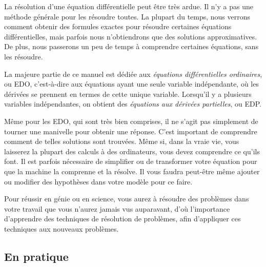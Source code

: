 La résolution d'une équation différentielle peut être très ardue.  
Il n'y a pas une méthode générale pour les résoudre toutes.
La plupart du temps, nous verrons comment obtenir des formules exactes 
pour résoudre certaines équations différentielles,
mais parfois nous n'obtiendrons que des solutions approximatives. 
De plus, nous passerons un peu de temps à comprendre certaines équations, sans les résoudre.

La majeure partie de ce manuel est dédiée aux
\emph{équations différentielles ordinaires},
ou EDO, c'est-à-dire aux équations ayant une seule variable indépendante, 
où les dérivées se prennent en termes de cette unique variable.
Lorsqu'il y a plusieurs variables indépendantes, on obtient des
\emph{équations aux dérivées partielles},
ou EDP.

Même pour les EDO, qui sont très bien comprises, 
il ne s'agit pas simplement de tourner une manivelle pour obtenir une réponse.
C'est important de comprendre comment de telles solutions sont trouvées.
Même si, dans la vraie vie, vous laisserez la plupart des calculs à des ordinateurs, 
vous devez comprendre ce qu'ils font.
Il est parfois nécessaire de simplifier ou de transformer votre équation 
pour que la machine la comprenne et la résolve.
Il vous faudra peut-être même ajouter ou modifier des hypothèses dans votre modèle pour ce faire.

Pour réussir en génie ou en science, vous aurez à résoudre des problèmes 
dans votre travail que vous n'aurez jamais vus auparavant,
d'où l'importance d'apprendre des techniques de résolution de problèmes, 
afin d'appliquer ces techniques aux nouveaux problèmes.

\subsection{En pratique}
\begin{myfig}
\end{myfig}

